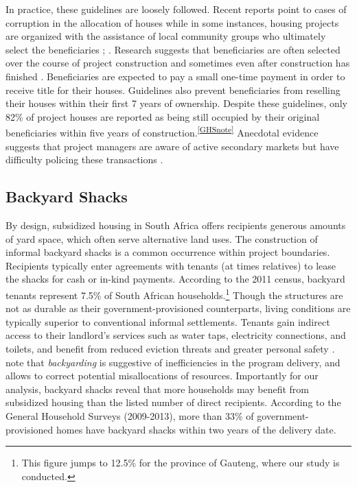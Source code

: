 \documentclass[12pt]{article}
\begin{document}
In practice, these guidelines are loosely followed.  Recent reports point to cases of corruption in the allocation of houses while in some instances, housing projects are organized with the assistance of local community groups who ultimately select the beneficiaries \citep{seriq}; \citep{casestudytinazonke}.  Research suggests that beneficiaries are often selected over the course of project construction and sometimes even after construction has finished \citep{seriq}. Beneficiaries are expected to pay a small one-time payment in order to receive title for their houses.  Guidelines also prevent beneficiaries from reselling their houses within their first 7 years of ownership.  Despite these guidelines, only 82\% of project houses are reported as being still occupied by their original beneficiaries within five years of construction.\textsuperscript{\ref{GHSnote}} Anecdotal evidence suggests that project managers are aware of active secondary markets but have difficulty policing these transactions \citep{resale}.

\subsection{Backyard Shacks}

By design, subsidized housing in South Africa offers recipients generous amounts of yard space, which often serve alternative land uses. The construction of informal backyard shacks is a common occurrence within project boundaries. Recipients typically enter agreements with tenants (at times relatives) to lease the shacks for cash or in-kind payments. According to the 2011 census, backyard tenants represent 7.5\% of South African households.\footnote{This figure jumps to 12.5\% for the province of Gauteng, where our study is conducted.} Though the structures are not as durable as their government-provisioned counterparts, living conditions are typically superior to conventional informal settlements. Tenants gain indirect access to their landlord's services such as water taps, electricity connections, and toilets, and benefit from reduced eviction threats and greater personal safety \citep{beall2003social}. \cite{Brueckner2018backyarding} note that {\it backyarding} is suggestive of inefficiencies in the program delivery, and allows to correct potential misallocations of resources. Importantly for our analysis, backyard shacks reveal that more households may benefit from subsidized housing than the listed number of direct recipients. According to the General Household Surveys (2009-2013), more than 33\% of government-provisioned homes have backyard shacks within two years of the delivery date. 
\end{document}
